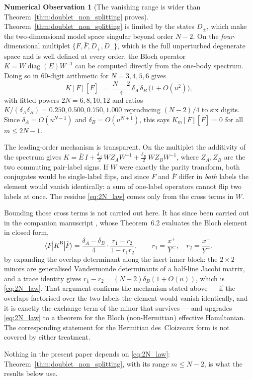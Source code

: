 \documentclass[11pt,a4paper]{article}
\theoremstyle{definition}
\newtheorem{observation}[theorem]{Numerical Observation}
\DeclareMathOperator{\diag}{diag}
\begin{document}
\begin{observation}[The vanishing range is wider than Theorem~\ref{thm:doublet_non_splitting} proves]\label{obs:2N}
Theorem~\ref{thm:doublet_non_splitting} is limited by the states $D_\pm$, which make the two-dimensional model space singular beyond order $N-2$. On the \emph{four}-dimensional multiplet $\{F,\bar F,D_+,D_-\}$, which is the full unperturbed degenerate space and is well defined at every order, the Bloch operator $K = W\diag(E)W^{-1}$ can be computed directly from the one-body spectrum. Doing so in $60$-digit arithmetic for $N = 3,4,5,6$ gives
\begin{equation}\label{eq:2N_law}
  K[F][\bar F] \;=\; \frac{N-2}{4}\,\delta_A\,\delta_B\,\bigl(1 + O(u^2)\bigr),
\end{equation}
with fitted powers $2N = 6,8,10,12$ and ratios $K/(\delta_A\delta_B) = 0.250, 0.500, 0.750, 1.000$ reproducing $(N-2)/4$ to six digits. Since $\delta_A = O(u^{N-1})$ and $\delta_B = O(u^{N+1})$, this says $K_m[F][\bar F] = 0$ for all $m \le 2N-1$.

The leading-order mechanism is transparent. On the multiplet the additivity of the spectrum gives
$K = \bar E\,I + \tfrac{\delta_A}{2}\,W Z_A W^{-1} + \tfrac{\delta_B}{2}\,W Z_B W^{-1}$,
where $Z_A, Z_B$ are the two commuting pair-label signs. If $W$ were exactly the parity transform, both conjugates would be single-label flips, and since $F$ and $\bar F$ differ in \emph{both} labels the element would vanish identically: a sum of one-label operators cannot flip two labels at once. The residue \eqref{eq:2N_law} comes only from the cross terms in $W$.

Bounding those cross terms is not carried out here. It has since been carried out in the companion manuscript \cite{Companion2026}, whose Theorem~6.2 evaluates the Bloch element in closed form,
\begin{equation}\label{eq:exactK}
  \langle F|K^{\mathrm{B}}|\bar F\rangle
  = \frac{\delta_A - \delta_B}{4}\cdot\frac{r_1 - r_2}{1 - r_1r_2},
  \qquad r_1 = \frac{x^+}{Y^-},\quad r_2 = \frac{x^-}{Y^+},
\end{equation}
by expanding the overlap determinant along the inert inner block: the $2\times2$ minors are generalised Vandermonde determinants of a half-line Jacobi matrix, and a trace identity gives $r_1 - r_2 = (N-2)\delta_B(1+O(u))$, which is \eqref{eq:2N_law}. That argument confirms the mechanism stated above --- if the overlaps factorised over the two labels the element would vanish identically, and it is exactly the exchange term of the minor that survives --- and upgrades \eqref{eq:2N_law} to a theorem for the Bloch (non-Hermitian) effective Hamiltonian. The corresponding statement for the Hermitian des~Cloizeaux form is not covered by either treatment.

Nothing in the present paper depends on \eqref{eq:2N_law}: Theorem~\ref{thm:doublet_non_splitting}, with its range $m\le N-2$, is what the results below use.
\end{observation}
\end{document}
